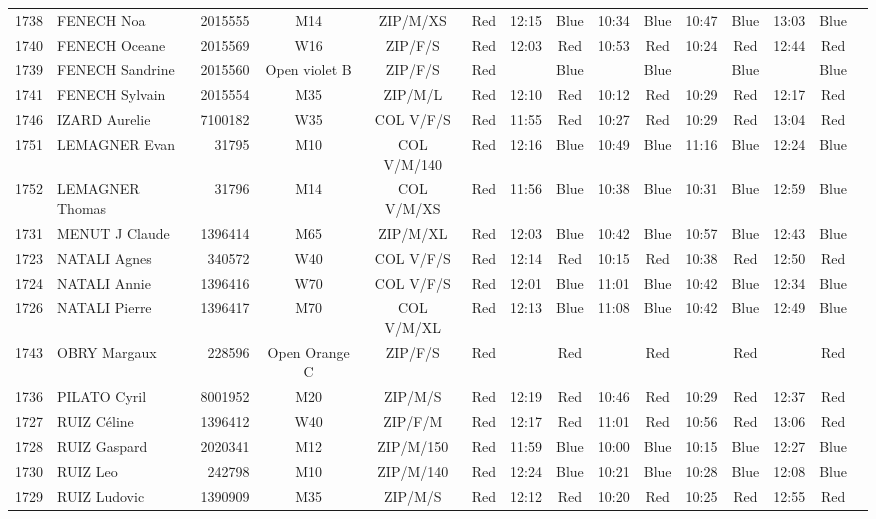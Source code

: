 \documentclass{report}
\begin{document}
\begin{longtable}{|c|l|r|c|c|*{5}{cc|}}
    1738 & FENECH Noa & 2015555 & M14 & ZIP/M/XS & Red & 12:15 & Blue & 10:34 & Blue & 10:47 & Blue & 13:03 & Blue &  \\
    1740 & FENECH Oceane & 2015569 & W16 & ZIP/F/S & Red & 12:03 & Red & 10:53 & Red & 10:24 & Red & 12:44 & Red &  \\
    1739 & FENECH Sandrine & 2015560 & Open violet B & ZIP/F/S & Red &   & Blue &   & Blue &   & Blue &   & Blue &  \\
    1741 & FENECH Sylvain & 2015554 & M35 & ZIP/M/L & Red & 12:10 & Red & 10:12 & Red & 10:29 & Red & 12:17 & Red &  \\
    1746 & IZARD Aurelie & 7100182 & W35 & COL V/F/S & Red & 11:55 & Red & 10:27 & Red & 10:29 & Red & 13:04 & Red &  \\
    1751 & LEMAGNER Evan & 31795 & M10 & COL V/M/140 & Red & 12:16 & Blue & 10:49 & Blue & 11:16 & Blue & 12:24 & Blue &  \\
    1752 & LEMAGNER Thomas & 31796 & M14 & COL V/M/XS & Red & 11:56 & Blue & 10:38 & Blue & 10:31 & Blue & 12:59 & Blue &  \\
    1731 & MENUT J Claude & 1396414 & M65 & ZIP/M/XL & Red & 12:03 & Blue & 10:42 & Blue & 10:57 & Blue & 12:43 & Blue &  \\
    1723 & NATALI Agnes & 340572 & W40 & COL V/F/S & Red & 12:14 & Red & 10:15 & Red & 10:38 & Red & 12:50 & Red &  \\
    1724 & NATALI Annie & 1396416 & W70 & COL V/F/S & Red & 12:01 & Blue & 11:01 & Blue & 10:42 & Blue & 12:34 & Blue &  \\
    1726 & NATALI Pierre & 1396417 & M70 & COL V/M/XL & Red & 12:13 & Blue & 11:08 & Blue & 10:42 & Blue & 12:49 & Blue &  \\
    1743 & OBRY Margaux & 228596 & Open Orange C & ZIP/F/S & Red &   & Red &   & Red &   & Red &   & Red &  \\
    1736 & PILATO Cyril & 8001952 & M20 & ZIP/M/S & Red & 12:19 & Red & 10:46 & Red & 10:29 & Red & 12:37 & Red &  \\
    1727 & RUIZ Céline & 1396412 & W40 & ZIP/F/M & Red & 12:17 & Red & 11:01 & Red & 10:56 & Red & 13:06 & Red &  \\
    1728 & RUIZ Gaspard & 2020341 & M12 & ZIP/M/150 & Red & 11:59 & Blue & 10:00 & Blue & 10:15 & Blue & 12:27 & Blue &  \\
    1730 & RUIZ Leo & 242798 & M10 & ZIP/M/140 & Red & 12:24 & Blue & 10:21 & Blue & 10:28 & Blue & 12:08 & Blue &  \\
    1729 & RUIZ Ludovic & 1390909 & M35 & ZIP/M/S & Red & 12:12 & Red & 10:20 & Red & 10:25 & Red & 12:55 & Red &  \\

\end{longtable}
\end{document}
